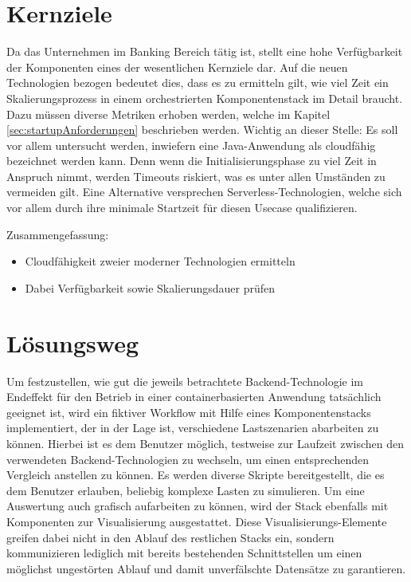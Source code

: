 \section{Kernziele}
\label{ss:kernziele}
Da das Unternehmen im Banking Bereich tätig ist, stellt eine hohe Verfügbarkeit der Komponenten eines der wesentlichen Kernziele dar. Auf die neuen Technologien bezogen bedeutet dies, dass es zu ermitteln gilt, wie viel Zeit ein Skalierungsprozess in einem orchestrierten Komponentenstack im Detail braucht. Dazu müssen diverse Metriken erhoben werden, welche im Kapitel \ref{sec:startupAnforderungen} beschrieben werden. Wichtig an dieser Stelle: Es soll vor allem untersucht werden, inwiefern eine Java-Anwendung als cloudfähig bezeichnet werden kann. Denn wenn die Initialisierungsphase zu viel Zeit in Anspruch nimmt, werden Timeouts riskiert, was es unter allen Umständen zu vermeiden gilt. Eine Alternative versprechen Serverless-Technologien, welche sich vor allem durch ihre minimale Startzeit für diesen Usecase qualifizieren.

Zusammengefassung: 
\begin{itemize}
  \item Cloudfähigkeit zweier moderner Technologien ermitteln
  \item Dabei Verfügbarkeit sowie Skalierungsdauer prüfen
\end{itemize}


\section{Lösungsweg}


Um festzustellen, wie gut die jeweils betrachtete Backend-Technologie im Endeffekt für den Betrieb in einer containerbasierten Anwendung tatsächlich geeignet ist, wird ein fiktiver Workflow mit Hilfe eines Komponentenstacks implementiert, der in der Lage ist, verschiedene Lastszenarien abarbeiten zu können. Hierbei ist es dem Benutzer möglich, testweise zur Laufzeit zwischen den verwendeten Backend-Technologien zu wechseln, um einen entsprechenden Vergleich anstellen zu können. Es werden diverse Skripte bereitgestellt, die es dem Benutzer erlauben, beliebig komplexe Lasten zu simulieren. Um eine Auswertung auch grafisch aufarbeiten zu können, wird der Stack ebenfalls mit Komponenten zur Visualisierung ausgestattet. Diese Visualisierungs-Elemente greifen dabei nicht in den Ablauf des restlichen Stacks ein, sondern kommunizieren lediglich mit bereits bestehenden Schnittstellen um einen möglichst ungestörten Ablauf und damit unverfälschte Datensätze zu garantieren. 

